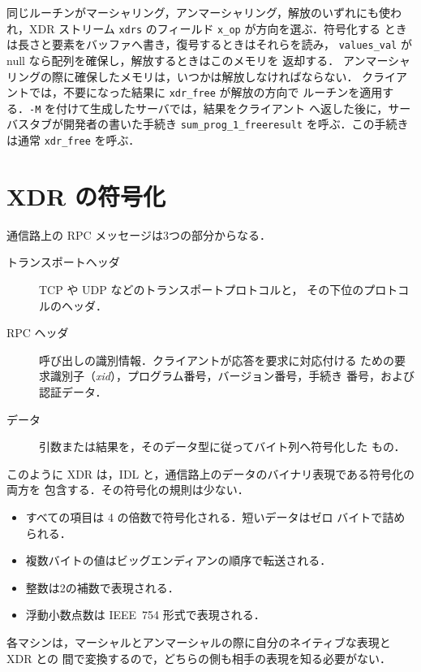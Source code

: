 \documentclass[../main.tex]{subfiles}
\begin{document}
同じルーチンがマーシャリング，アンマーシャリング，解放のいずれにも使われ，XDR
ストリーム \texttt{xdrs} のフィールド \texttt{x\_op} が方向を選ぶ．符号化する
ときは長さと要素をバッファへ書き，復号するときはそれらを読み，
\texttt{values\_val} が null なら配列を確保し，解放するときはこのメモリを
返却する．
アンマーシャリングの際に確保したメモリは，いつかは解放しなければならない．
クライアントでは，不要になった結果に \texttt{xdr\_free} が解放の方向で
ルーチンを適用する．\texttt{-M} を付けて生成したサーバでは，結果をクライアント
へ返した後に，サーバスタブが開発者の書いた手続き
\texttt{sum\_prog\_1\_freeresult} を呼ぶ．この手続きは通常 \texttt{xdr\_free}
を呼ぶ．

\section{XDR の符号化}
\label{sec:l13-encoding}

通信路上の RPC メッセージは3つの部分からなる．
\begin{description}
  \item[トランスポートヘッダ] TCP や UDP などのトランスポートプロトコルと，
    その下位のプロトコルのヘッダ．
  \item[RPC ヘッダ] 呼び出しの識別情報．クライアントが応答を要求に対応付ける
    ための要求識別子（\emph{xid}），プログラム番号，バージョン番号，手続き
    番号，および認証データ．
  \item[データ] 引数または結果を，そのデータ型に従ってバイト列へ符号化した
    もの．
\end{description}
このように XDR は，IDL と，通信路上のデータのバイナリ表現である符号化の両方を
包含する．その符号化の規則は少ない．
\begin{itemize}
  \item すべての項目は \SI{4}{\byte} の倍数で符号化される．短いデータはゼロ
    バイトで詰められる．
  \item 複数バイトの値はビッグエンディアンの順序で転送される．
  \item 整数は2の補数で表現される．
  \item 浮動小数点数は IEEE~754 形式で表現される．
\end{itemize}
各マシンは，マーシャルとアンマーシャルの際に自分のネイティブな表現と XDR との
間で変換するので，どちらの側も相手の表現を知る必要がない．
\end{document}
